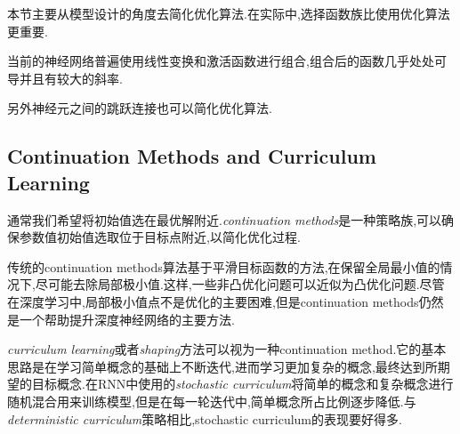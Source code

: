 本节主要从模型设计的角度去简化优化算法.在实际中,选择函数族比使用优化算法更重要.

当前的神经网络普遍使用线性变换和激活函数进行组合,组合后的函数几乎处处可导并且有较大的斜率.

另外神经元之间的跳跃连接也可以简化优化算法.

\subsection{Continuation Methods and Curriculum Learning}

通常我们希望将初始值选在最优解附近.\textit{continuation methods}是一种策略族,可以确保参数值初始值选取位于目标点附近,以简化优化过程.

传统的continuation methods算法基于平滑目标函数的方法,在保留全局最小值的情况下,尽可能去除局部极小值.这样,一些非凸优化问题可以近似为凸优化问题.尽管在深度学习中,局部极小值点不是优化的主要困难,但是continuation methods仍然是一个帮助提升深度神经网络的主要方法.

\textit{curriculum learning}或者\textit{shaping}方法可以视为一种continuation method.它的基本思路是在学习简单概念的基础上不断迭代,进而学习更加复杂的概念,最终达到所期望的目标概念.在RNN中使用的\textit{stochastic curriculum}将简单的概念和复杂概念进行随机混合用来训练模型,但是在每一轮迭代中,简单概念所占比例逐步降低.与\textit{deterministic curriculum}策略相比,stochastic curriculum的表现要好得多.